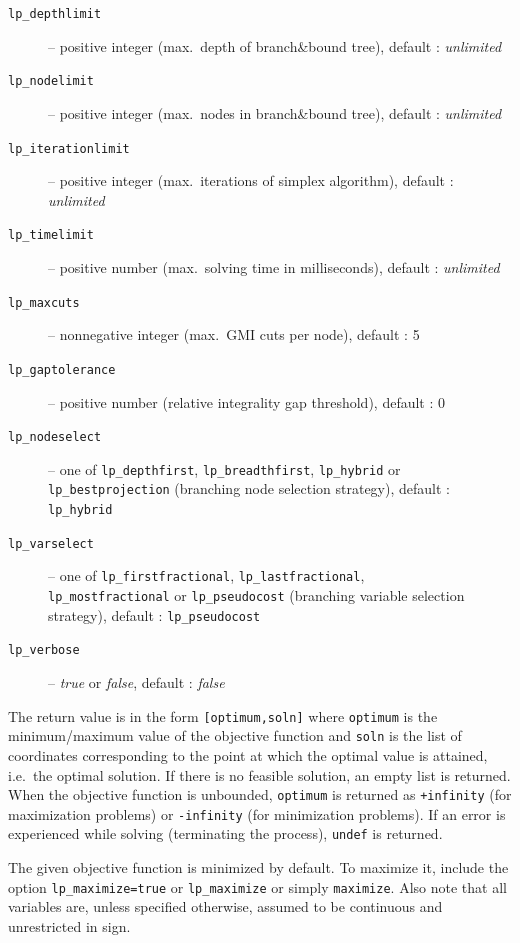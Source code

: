 \documentclass[a4paper,11pt]{book}
\begin{document}
\begin{enumerate}
\begin{description}
	\item [\tt lp\_depthlimit] -- positive integer (max.~depth of branch\&bound tree), default : \emph{unlimited}
	\item [\tt lp\_nodelimit] -- positive integer (max.~nodes in branch\&bound tree), default : \emph{unlimited}
	\item [\tt lp\_iterationlimit] -- positive integer (max.~iterations of simplex algorithm), default : \emph{unlimited}
	\item [\tt lp\_timelimit] -- positive number (max.~solving time in milliseconds), default : \emph{unlimited}
	\item[\tt lp\_maxcuts] -- nonnegative integer (max.~GMI cuts per node), default : 5
	\item [\tt lp\_gaptolerance] -- positive number (relative integrality gap threshold), default : 0
	\item[\tt lp\_nodeselect] -- one of {\tt lp\_depthfirst}, {\tt lp\_breadthfirst}, {\tt lp\_hybrid} or {\tt lp\_bestprojection} (branching node selection strategy), default : {\tt lp\_hybrid}
	\item[\tt lp\_varselect] -- one of {\tt lp\_firstfractional}, {\tt lp\_lastfractional},\\{\tt lp\_mostfractional} or {\tt lp\_pseudocost} (branching variable selection strategy), default : {\tt lp\_pseudocost}
	\item [\tt lp\_verbose] -- \emph{true} or \emph{false}, default : \emph{false}
\end{description}
\end{enumerate}

The return value is in the form {\tt [optimum,soln]} where {\tt optimum} is the minimum/maximum value of the objective function and {\tt soln} is the list of coordinates corresponding to the point at which the optimal value is attained, i.e.~the optimal solution. If there is no feasible solution, an empty list is returned. When the objective function is unbounded, {\tt optimum} is returned as {\tt +infinity} (for maximization problems) or {\tt -infinity} (for minimization problems). If an error is experienced while solving (terminating the process), {\tt undef} is returned.

The given objective function is minimized by default. To maximize it, include the option {\tt lp\_maximize=true} or {\tt lp\_maximize} or simply {\tt maximize}. Also note that all variables are, unless specified otherwise, assumed to be continuous and unrestricted in sign.
\end{document}

